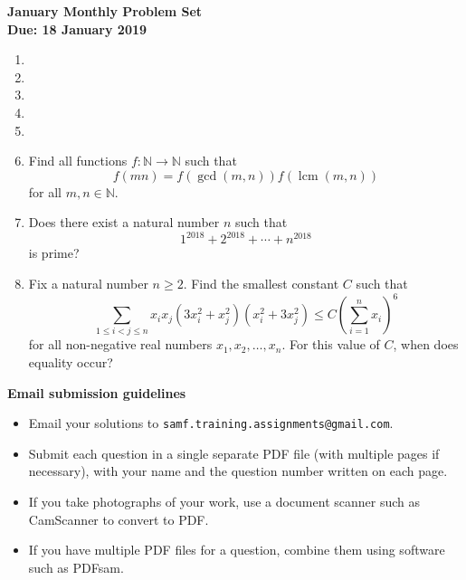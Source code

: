 \documentclass{article}
\DeclareMathOperator{\lcm}{lcm}
\begin{document}
\begin{center}
\textbf{\Large January Monthly Problem Set}
\\ \vspace{1em}
\textbf{\large Due: 18 January 2019}
\end{center}

\begin{enumerate}[1.]

\item 


\vspace{6pt}
\item 


\vspace{6pt}
\item 


\vspace{6pt}
\item 


\vspace{6pt}
\item 


\vspace{6pt}
\item
Find all functions $f : \mathbb{N} \to \mathbb{N}$ such that
\[
	f(mn) = f(\gcd(m, n)) f(\lcm(m, n))
\]
for all $m, n \in \mathbb{N}$.


\vspace{6pt}
\item
Does there exist a natural number $n$ such that
\[
	1^{2018} + 2^{2018} + \cdots + n^{2018}
\]
is prime?


\vspace{6pt}
\item %
Fix a natural number $n \geq 2$. Find the smallest constant $C$ such that
\[
	 \sum_{1 \leq i < j \leq n} x_i x_j (3x_i^2 + x_j^2)(x_i^2 + 3x_j^2) \leq C {\left( \sum_{i = 1}^{n} x_i \right)}^6
\]
for all non-negative real numbers $x_1, x_2, \dots, x_n$. For this value of $C$, when does equality occur?

\end{enumerate}


\vfill
\textbf{\Large Email submission guidelines}
\begin{itemize}
	\item Email your solutions to \verb!samf.training.assignments@gmail.com!.
	\item Submit each question in a single separate PDF file (with multiple pages if necessary), with your name and the question number written on each page.
	\item If you take photographs of your work, use a document scanner such as CamScanner to convert to PDF.
	\item If you have multiple PDF files for a question, combine them using software such as PDFsam.
\end{itemize}
\end{document}
